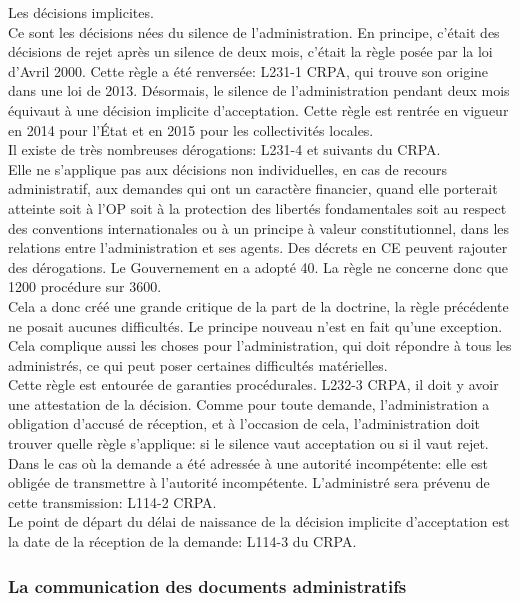 \documentclass[10pt, a4paper, openany]{book}
\begin{document}
Les décisions implicites. \\
Ce sont les décisions nées du silence de l'administration. En principe, c'était des décisions de rejet après un silence de deux mois, c'était la règle posée par la loi d'Avril 2000. Cette règle a été renversée: L231-1 CRPA, qui trouve son origine dans une loi de 2013. Désormais, le silence de l'administration pendant deux mois équivaut à une décision implicite d'acceptation. Cette règle est rentrée en vigueur en 2014 pour l'État et en 2015 pour les collectivités locales. \\
Il existe de très nombreuses dérogations: L231-4 et suivants du CRPA. \\
Elle ne s'applique pas aux décisions non individuelles, en cas de recours administratif, aux demandes qui ont un caractère financier, quand elle porterait atteinte soit à l'OP soit à la protection des libertés fondamentales soit au respect des conventions internationales ou à un principe à valeur constitutionnel, dans les relations entre l'administration et ses agents. Des décrets en CE peuvent rajouter des dérogations. Le Gouvernement en a adopté 40. La règle ne concerne donc que 1200 procédure sur 3600. \\
Cela a donc créé une grande critique de la part de la doctrine, la règle précédente ne posait aucunes difficultés. Le principe nouveau n'est en fait qu'une exception. \\
Cela complique aussi les choses pour l'administration, qui doit répondre à tous les administrés, ce qui peut poser certaines difficultés matérielles. \\
Cette règle est entourée de garanties procédurales. L232-3 CRPA, il doit y avoir une attestation de la décision. Comme pour toute demande, l'administration a obligation d'accusé de réception, et à l'occasion de cela, l'administration doit trouver quelle règle s'applique: si le silence vaut acceptation ou si il vaut rejet. \\
Dans le cas où la demande a été adressée à une autorité incompétente: elle est obligée de transmettre à l'autorité incompétente. L'administré sera prévenu de cette transmission: L114-2 CRPA. \\
Le point de départ du délai de naissance de la décision implicite d'acceptation est la date de la réception de la demande: L114-3 du CRPA.

\subsubsection{La communication des documents administratifs}
\end{document}
